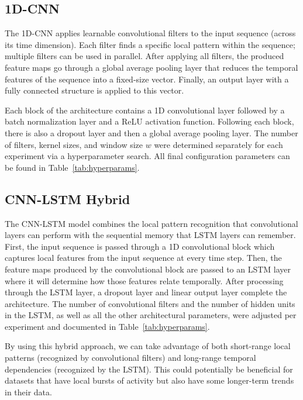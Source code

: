\clearpage
\subsection{1D-CNN}

The 1D-CNN applies learnable convolutional filters to the input sequence (across its time dimension). Each filter finds a specific local pattern within the sequence; multiple filters can be used in parallel. After applying all filters, the produced feature maps go through a global average pooling layer that reduces the temporal features of the sequence into a fixed-size vector. Finally, an output layer with a fully connected structure is applied to this vector.

Each block of the architecture contains a 1D convolutional layer followed by a batch normalization layer and a ReLU activation function. Following each block, there is also a dropout layer and then a global average pooling layer. The number of filters, kernel sizes, and window size $w$ were determined separately for each experiment via a hyperparameter search. All final configuration parameters can be found in Table~\ref{tab:hyperparams}.

\subsection{CNN-LSTM Hybrid}

The CNN-LSTM model combines the local pattern recognition that convolutional layers can perform with the sequential memory that LSTM layers can remember. First, the input sequence is passed through a 1D convolutional block which captures local features from the input sequence at every time step. Then, the feature maps produced by the convolutional block are passed to an LSTM layer where it will determine how those features relate temporally. After processing through the LSTM layer, a dropout layer and linear output layer complete the architecture. The number of convolutional filters and the number of hidden units in the LSTM, as well as all the other architectural parameters, were adjusted per experiment and documented in Table~\ref{tab:hyperparams}.

By using this hybrid approach, we can take advantage of both short-range local patterns (recognized by convolutional filters) and long-range temporal dependencies (recognized by the LSTM). This could potentially be beneficial for datasets that have local bursts of activity but also have some longer-term trends in their data.

